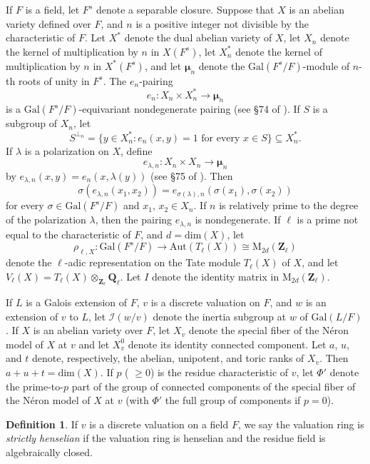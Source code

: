 \documentclass{amsart}
\def\Q{{\mathbf Q}}
\def\Z{{\mathbf Z}}
\def\Gal{\mathrm{Gal}}
\def\Aut{\mathrm{Aut}}
\def\I{{\mathcal I}}
\def\M{\mathrm{M}}
\def\dim{\mathrm{dim}}
\def\bmu{\boldsymbol \mu}
\theoremstyle{definition}
\newtheorem{defn}[thm]{Definition}
\begin{document}
If $F$ is a field, let $F^s$ denote a separable closure. 
Suppose that $X$ is an abelian variety defined over 
$F$, and $n$ is a positive integer not divisible by the characteristic
of $F$. Let $X^\ast$ denote the dual abelian variety of $X$, let
$X_n$ denote the kernel of multiplication by $n$ in $X(F^s)$, let
$X_n^\ast$ denote the kernel of multiplication by $n$ in $X^\ast(F^s)$,
and let $\bmu _n$ denote the $\Gal (F^s/F)$-module
of $n$-th roots of unity in $F^s$. 
The $e_n$-pairing 
$$e_n : X_n \times X_n^\ast \to {\bmu}_n$$
is a $\Gal(F^s/F)$-equivariant nondegenerate pairing 
(see \S 74 of \cite{WeilAV}).
If $S$ is a subgroup of $X_n$, let 
$$S^{\perp_n} = 
\{ y \in X_n^\ast : e_n(x,y) = 1 \text{ for every } x \in S \}
\subseteq X_n^\ast.$$
If $\lambda$ is a polarization on $X$, define
$$e_{\lambda ,n} : X_n \times X_n \to {\bmu}_n$$
by $e_{\lambda ,n}(x,y) = e_n(x,\lambda(y))$
(see \S 75 of \cite{WeilAV}). Then
$$\sigma (e_{\lambda ,n}(x_1,x_2)) = 
e_{\sigma (\lambda ),n}(\sigma (x_1),\sigma (x_2))$$ for every 
$\sigma \in \Gal (F^s/F)$ and $x_1$, $x_2 \in X_n$. If $n$ is relatively prime 
to the degree of the polarization $\lambda$, then the pairing 
$e_{\lambda ,n}$ is nondegenerate.
If $\ell$ is a prime not equal to the characteristic of $F$,
and $d = \dim(X)$, let
$$\rho_{\ell,X} : \Gal(F^s/F) \to \Aut(T_\ell(X)) \cong \M_{2d}(\Z_\ell)$$
denote the $\ell$-adic representation on the Tate module $T_\ell(X)$
of $X$, and let $V_\ell(X) = T_\ell(X) \otimes_{\Z_\ell} \Q_\ell$.
Let $I$ denote the identity matrix in $\M_{2d}(\Z_\ell)$.

If $L$ is a Galois extension of $F$,
$v$ is a discrete valuation on $F$, and $w$ is an extension of $v$ to $L$,
let $\I(w/v)$ denote the inertia subgroup at $w$ of $\Gal(L/F)$.
If $X$ is an abelian variety over $F$, let $X_v$ denote the 
special fiber of the N\'eron model
of $X$ at $v$ and let $X_v^0$ denote its identity connected
component. Let $a$, $u$, and $t$ denote, respectively, the abelian,
unipotent, and toric ranks of $X_v$. Then $a + u + t = \dim(X)$.
If $p$ ( $\ge 0$) is the residue characteristic of $v$, 
let $\Phi '$ denote the prime-to-$p$ part of the group of 
connected components of the special
fiber of the N\'eron model of $X$ at $v$ (with $\Phi '$ the full
group of components if $p = 0$). 

\begin{defn}
If $v$ is a discrete valuation on a field $F$, we say
the valuation ring is 
{\em strictly henselian} if the valuation ring is henselian and 
the residue field is algebraically closed.
\end{defn}
\end{document}
